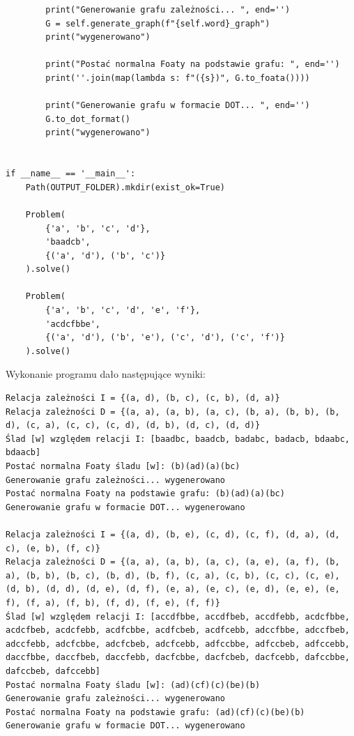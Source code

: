 \documentclass[12pt]{article}
\begin{document}
\begin{verbatim}
        print("Generowanie grafu zależności... ", end='')
        G = self.generate_graph(f"{self.word}_graph")
        print("wygenerowano")

        print("Postać normalna Foaty na podstawie grafu: ", end='')
        print(''.join(map(lambda s: f"({s})", G.to_foata())))

        print("Generowanie grafu w formacie DOT... ", end='')
        G.to_dot_format()
        print("wygenerowano")


if __name__ == '__main__':
    Path(OUTPUT_FOLDER).mkdir(exist_ok=True)

    Problem(
        {'a', 'b', 'c', 'd'},
        'baadcb',
        {('a', 'd'), ('b', 'c')}
    ).solve()

    Problem(
        {'a', 'b', 'c', 'd', 'e', 'f'},
        'acdcfbbe',
        {('a', 'd'), ('b', 'e'), ('c', 'd'), ('c', 'f')}
    ).solve()

\end{verbatim}
Wykonanie programu dało następujące wyniki:
\begin{verbatim}
Relacja zależności I = {(a, d), (b, c), (c, b), (d, a)}
Relacja zależności D = {(a, a), (a, b), (a, c), (b, a), (b, b), (b, d), (c, a), (c, c), (c, d), (d, b), (d, c), (d, d)}
Ślad [w] względem relacji I: [baadbc, baadcb, badabc, badacb, bdaabc, bdaacb]
Postać normalna Foaty śladu [w]: (b)(ad)(a)(bc)
Generowanie grafu zależności... wygenerowano
Postać normalna Foaty na podstawie grafu: (b)(ad)(a)(bc)
Generowanie grafu w formacie DOT... wygenerowano

Relacja zależności I = {(a, d), (b, e), (c, d), (c, f), (d, a), (d, c), (e, b), (f, c)}
Relacja zależności D = {(a, a), (a, b), (a, c), (a, e), (a, f), (b, a), (b, b), (b, c), (b, d), (b, f), (c, a), (c, b), (c, c), (c, e), (d, b), (d, d), (d, e), (d, f), (e, a), (e, c), (e, d), (e, e), (e, f), (f, a), (f, b), (f, d), (f, e), (f, f)}
Ślad [w] względem relacji I: [accdfbbe, accdfbeb, accdfebb, acdcfbbe, acdcfbeb, acdcfebb, acdfcbbe, acdfcbeb, acdfcebb, adccfbbe, adccfbeb, adccfebb, adcfcbbe, adcfcbeb, adcfcebb, adfccbbe, adfccbeb, adfccebb, daccfbbe, daccfbeb, daccfebb, dacfcbbe, dacfcbeb, dacfcebb, dafccbbe, dafccbeb, dafccebb]
Postać normalna Foaty śladu [w]: (ad)(cf)(c)(be)(b)
Generowanie grafu zależności... wygenerowano
Postać normalna Foaty na podstawie grafu: (ad)(cf)(c)(be)(b)
Generowanie grafu w formacie DOT... wygenerowano
\end{verbatim}
\vspace{0.5cm}
\end{document}
